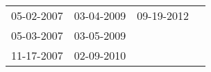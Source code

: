 \begin{supertabular}{llll}
 05-02-2007 &  03-04-2009 &  09-19-2012 \\
 05-03-2007 &  03-05-2009 &             \\
 11-17-2007 &  02-09-2010 &             \\
\end{supertabular}
